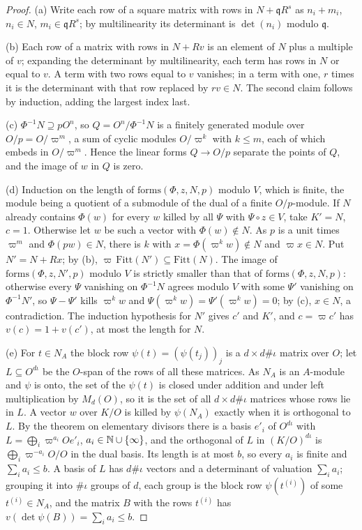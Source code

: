 \begin{proof}
(a) Write each row of a square matrix with rows in $N+\mathfrak qR^s$ as $n_i+m_i$, $n_i\in N$, $m_i\in\mathfrak qR^s$; by multilinearity its determinant is $\det(n_i)$ modulo $\mathfrak q$.

(b) Each row of a matrix with rows in $N+Rv$ is an element of $N$ plus a multiple of $v$; expanding the determinant by multilinearity, each term has rows in $N$ or equal to $v$. A term with two rows equal to $v$ vanishes; in a term
with one, $r$ times it is the determinant with that row replaced by $rv\in N$. The second claim follows by induction, adding the largest index last.

(c) $\Phi^{-1}N\supseteq pO^n$, so $Q=O^n/\Phi^{-1}N$ is a finitely generated module over $O/p=O/\varpi^m$, a sum of cyclic modules $O/\varpi^k$ with $k\le m$, each of which embeds in $O/\varpi^m$. Hence the linear forms $Q\to O/p$
separate the points of $Q$, and the image of $w$ in $Q$ is zero.

(d) Induction on the length of $\mathrm{forms}(\Phi,z,N,p)$ modulo $V$, which is finite, the module being a quotient of a submodule of the dual of a finite $O/p$-module. If $N$ already contains $\Phi(w)$ for every $w$ killed by all
$\Psi$ with $\Psi\circ z\in V$, take $K'=N$, $c=1$. Otherwise let $w$ be such a vector with $\Phi(w)\notin N$. As $p$ is a unit times $\varpi^m$ and $\Phi(pw)\in N$, there is $k$ with $x=\Phi(\varpi^kw)\notin N$ and $\varpi x\in N$. Put $N'=N+Rx$; by (b),
$\varpi\,\mathrm{Fitt}(N')\subseteq\mathrm{Fitt}(N)$. The image of $\mathrm{forms}(\Phi,z,N',p)$ modulo $V$ is strictly smaller than that of $\mathrm{forms}(\Phi,z,N,p)$: otherwise every $\Psi$ vanishing on $\Phi^{-1}N$ agrees modulo $V$ with some $\Psi'$ vanishing on
$\Phi^{-1}N'$, so $\Psi-\Psi'$ kills $\varpi^kw$ and $\Psi(\varpi^kw)=\Psi'(\varpi^kw)=0$; by (c), $x\in N$, a contradiction. The induction hypothesis for $N'$ gives $c'$ and $K'$, and $c=\varpi c'$ has $v(c)=1+v(c')$, at most the length for $N$.

(e) For $t\in N_A$ the block row $\psi(t)=(\psi(t_j))_j$ is a $d\times d\#\iota$ matrix over $O$; let $L\subseteq O^{d\iota}$ be the $O$-span of the rows of all these matrices. As $N_A$ is an $A$-module and $\psi$ is onto, the set of the $\psi(t)$ is closed under
addition and under left multiplication by $M_d(O)$, so it is the set of all $d\times d\#\iota$ matrices whose rows lie in $L$. A vector $w$ over $K/O$ is killed by $\psi(N_A)$ exactly when it is orthogonal to $L$. By the theorem on elementary
divisors there is a basis $e'_i$ of $O^{d\iota}$ with $L=\bigoplus_i\varpi^{a_i}Oe'_i$, $a_i\in\mathbb{N}\cup\{\infty\}$, and the orthogonal of $L$ in $(K/O)^{d\iota}$ is $\bigoplus_i\varpi^{-a_i}O/O$ in the dual basis. Its length is at most $b$, so every $a_i$ is finite and
$\sum_ia_i\le b$. A basis of $L$ has $d\#\iota$ vectors and a determinant of valuation $\sum_ia_i$; grouping it into $\#\iota$ groups of $d$, each group is the block row $\psi(t^{(i)})$ of some $t^{(i)}\in N_A$, and the matrix $B$ with the rows
$t^{(i)}$ has $v(\det\psi(B))=\sum_ia_i\le b$.
\end{proof}


